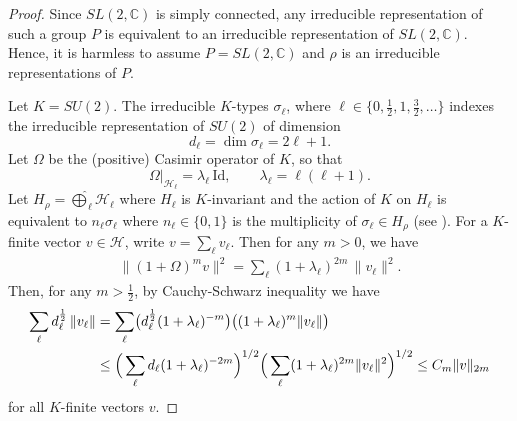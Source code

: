 \documentclass[11 pt]{amsart}
\newcommand{\norm}[1]{\lVert#1\rVert}
\theoremstyle{definition}
\numberwithin{equation}{section}
\begin{document}
\begin{proof} Since $SL(2,\mathbb C)$ is simply connected,
any irreducible representation of such a group $P$ is equivalent to an
irreducible representation of $SL(2,\mathbb C)$. Hence, it is harmless to assume \(P = SL(2,\mathbb C)\) and $\rho$ is an irreducible representations of $P$.

Let \(K = SU(2)\).  The irreducible \(K\)-types $\sigma_\ell$, where \(\ell \in \{0,\tfrac12,1,\tfrac32,\dots\}\) indexes the irreducible
representation of \(SU(2)\) of dimension
\[
  d_\ell = \dim \mathcal \sigma_\ell = 2\ell + 1.
\]
Let \(\Omega\) be the (positive) Casimir operator of \(K\), so that
\[
  \Omega|_{\mathcal H_\ell} = \lambda_\ell \,\mathrm{Id}, \qquad
  \lambda_\ell=\ell(\ell+1).
\]
Let $H_\rho = \widehat{\bigoplus}_{\ell} \mathcal H_\ell$
where $H_\ell$ is $K$-invariant and the action of $K$ on $H_\ell$ is equivalent to $n_\ell\sigma_\ell$ where $n_\ell\in\{0,1\}$ is the multiplicity of $\sigma_\ell\in H_\rho$ (see \cite{Knapp}).  For a \(K\)-finite vector \(v \in \mathcal H\), write $v = \sum_{\ell} v_{\ell}$. Then for any \(m > 0\), we have
\begin{align*}
\|(1+\Omega)^m v\|^2
  = \sum_{\ell} (1+\lambda_\ell)^{2m} \,\|v_\ell\|^2.
\end{align*}
Then, for any \(m > \tfrac12\), by Cauchy-Schwarz inequality we have
\begin{align}\label{for:1}
\sum_{\ell} d_\ell^{\frac{1}{2}} \,\|v_\ell\|
 &= \sum_{\ell}
    \bigl(d_\ell^{\frac{1}{2}} (1+\lambda_\ell)^{-m}\bigr)
    \bigl((1+\lambda_\ell)^m \|v_\ell\|\bigr) \notag\\
 &\le \Big(\sum_{\ell} d_\ell (1+\lambda_\ell)^{-2m}\Big)^{1/2}
      \Big(\sum_{\ell} (1+\lambda_\ell)^{2m} \|v_\ell\|^2\Big)^{1/2}\leq C_m\norm{v}_{2m}
\end{align}
for all \(K\)-finite vectors \(v\).





\end{proof}
\end{document}
